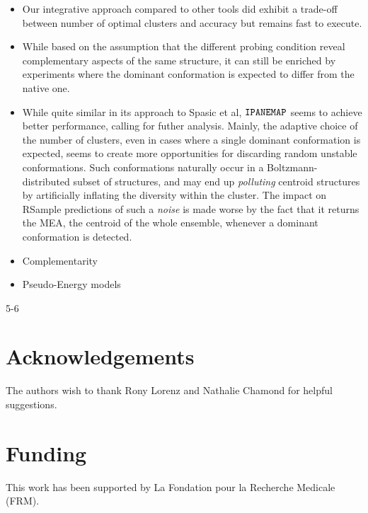 \documentclass[a4,center,fleqn]{NAR}
\newcommand{\Software}[1]{$\text{\ttfamily #1}$}
\newcommand{\OurTool}{\Software{IPANEMAP}\xspace}
\newcommand{\Blabla}[1][5-6]{{\color{blue!40!white}\lipsum*[#1]}}
\begin{document}
\begin{itemize}
	\item Our integrative approach compared to other tools did exhibit a trade-off  between  number of optimal clusters and accuracy but remains fast to execute. 
	\item While based on the assumption that the different probing condition reveal complementary aspects of the same structure, it can still be enriched by experiments where the dominant conformation is expected to differ from the native one.
	\item While quite similar in its approach to Spasic et al, \OurTool seems to achieve better performance, calling for futher analysis. 
	Mainly, the adaptive choice of the number of clusters, even in cases where a single dominant conformation is expected, seems to create more opportunities for discarding random unstable conformations. Such conformations naturally occur in a Boltzmann-distributed subset of structures, and may end up \emph{polluting} centroid structures by artificially inflating the diversity within the cluster. The impact on RSample predictions of such a \emph{noise} is made worse by the fact that it returns the MEA, the centroid of the whole ensemble, whenever a dominant conformation is detected.
	\item Complementarity
	\item Pseudo-Energy models
\end{itemize}

\Blabla{5-6}

\section*{Acknowledgements}
The authors wish to thank Rony Lorenz and Nathalie Chamond for helpful suggestions.

\section*{Funding}
This work has been supported by La Fondation pour la Recherche Medicale (FRM).
%


\end{document}
